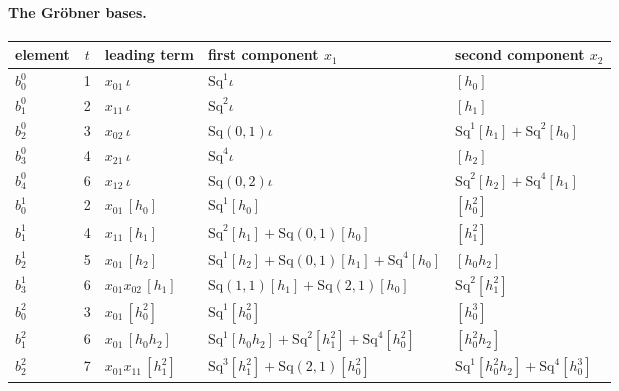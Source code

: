 \documentclass[11pt]{article}
\newcommand{\Sq}{\mathrm{Sq}}
\begin{document}
\paragraph{The Gröbner bases.}
\begin{center}
\small
\begin{longtable}{lclll}
\toprule
element & $t$ & leading term & first component $x_1$ & second component $x_2$ \\
\midrule
$b^{0}_{0}$ & 1 & $x_{01}\,\iota$ & $\Sq^{1}\iota$ & $[h_0]$ \\
$b^{0}_{1}$ & 2 & $x_{11}\,\iota$ & $\Sq^{2}\iota$ & $[h_1]$ \\
$b^{0}_{2}$ & 3 & $x_{02}\,\iota$ & $\Sq(0,1)\iota$ & $\Sq^{1}[h_1] + \Sq^{2}[h_0]$ \\
$b^{0}_{3}$ & 4 & $x_{21}\,\iota$ & $\Sq^{4}\iota$ & $[h_2]$ \\
$b^{0}_{4}$ & 6 & $x_{12}\,\iota$ & $\Sq(0,2)\iota$ & $\Sq^{2}[h_2] + \Sq^{4}[h_1]$ \\
$b^{1}_{0}$ & 2 & $x_{01}\,[h_0]$ & $\Sq^{1}[h_0]$ & $[h_0^2]$ \\
$b^{1}_{1}$ & 4 & $x_{11}\,[h_1]$ & $\Sq^{2}[h_1] + \Sq(0,1)[h_0]$ & $[h_1^2]$ \\
$b^{1}_{2}$ & 5 & $x_{01}\,[h_2]$ & $\Sq^{1}[h_2] + \Sq(0,1)[h_1] + \Sq^{4}[h_0]$ & $[h_0h_2]$ \\
$b^{1}_{3}$ & 6 & $x_{01}x_{02}\,[h_1]$ & $\Sq(1,1)[h_1] + \Sq(2,1)[h_0]$ & $\Sq^{2}[h_1^2]$ \\
$b^{2}_{0}$ & 3 & $x_{01}\,[h_0^2]$ & $\Sq^{1}[h_0^2]$ & $[h_0^3]$ \\
$b^{2}_{1}$ & 6 & $x_{01}\,[h_0h_2]$ & $\Sq^{1}[h_0h_2] + \Sq^{2}[h_1^2] + \Sq^{4}[h_0^2]$ & $[h_0^2h_2]$ \\
$b^{2}_{2}$ & 7 & $x_{01}x_{11}\,[h_1^2]$ & $\Sq^{3}[h_1^2] + \Sq(2,1)[h_0^2]$ & $\Sq^{1}[h_0^2h_2] + \Sq^{4}[h_0^3]$ \\
\bottomrule
\end{longtable}
\end{center}
\end{document}
